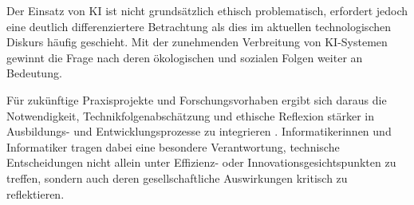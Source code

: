 Der Einsatz von KI ist nicht grundsätzlich ethisch problematisch, erfordert jedoch eine deutlich differenziertere Betrachtung als dies im aktuellen technologischen Diskurs häufig geschieht. Mit der zunehmenden Verbreitung
von KI-Systemen gewinnt die Frage nach deren ökologischen und sozialen Folgen weiter an Bedeutung.

Für zukünftige Praxisprojekte und Forschungsvorhaben ergibt sich daraus die Notwendigkeit, Technikfolgenabschätzung und ethische Reflexion stärker in Ausbildungs- und Entwicklungsprozesse zu integrieren \cite{grunwaldTechnikfolgenabschaetzungEinfuehrung2025}. Informatikerinnen und
Informatiker tragen dabei eine besondere Verantwortung, technische Entscheidungen nicht allein unter Effizienz- oder Innovationsgesichtspunkten zu treffen, sondern auch deren gesellschaftliche Auswirkungen kritisch zu reflektieren.
